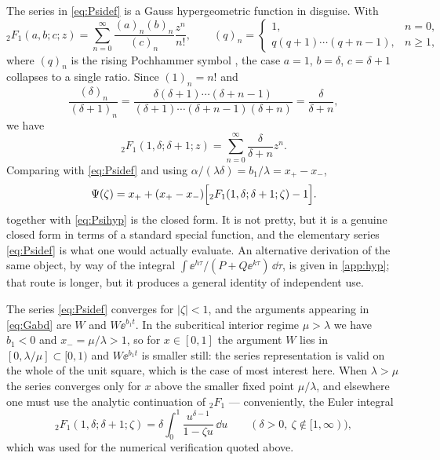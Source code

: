 The series in \cref{eq:Psidef} is a Gauss hypergeometric function in disguise. With
\begin{equation}
\label{eq:2F1def}
{}_2F_1(a,b;c;z) = \sum_{n=0}^{\infty}\frac{(a)_n(b)_n}{(c)_n}\frac{z^n}{n!},
\qquad
(q)_n = \begin{cases}1, & n=0,\\ q(q+1)\cdots(q+n-1), & n\ge1,\end{cases}
\end{equation}
where $(q)_n$ is the rising Pochhammer symbol \cite{Olver2010}, the case $a=1$,
$b=\delta$, $c=\delta+1$ collapses to a single ratio. Since $(1)_n = n!$ and
\begin{equation}
\label{eq:pochcancel}
\frac{(\delta)_n}{(\delta+1)_n}
= \frac{\delta(\delta+1)\cdots(\delta+n-1)}{(\delta+1)\cdots(\delta+n-1)(\delta+n)}
= \frac{\delta}{\delta+n},
\end{equation}
we have
\begin{equation}
\label{eq:2F1simple}
{}_2F_1(1,\delta;\delta+1;z) = \sum_{n=0}^{\infty}\frac{\delta}{\delta+n}z^n .
\end{equation}
Comparing with \cref{eq:Psidef} and using
$\alpha/(\lambda\delta) = b_1/\lambda = x_+-x_-$,
\begin{equation}
\label{eq:Psihyp}
\Psi(\zeta) = x_+ + (x_+-x_-)\Bigl[{}_2F_1(1,\delta;\delta+1;\zeta)-1\Bigr] .
\end{equation}
 together with \cref{eq:Psihyp} is the closed form. It is not pretty,
but it is a genuine closed form in terms of a standard special function, and the
elementary series \cref{eq:Psidef} is what one would actually evaluate. An
alternative derivation of the same object, by way of the integral
$\int\ee^{h\tau}/(P+Q\ee^{k\tau})\,\dd\tau$, is given in \cref{app:hyp}; that route
is longer, but it produces a general identity of independent use.

\begin{remark}
\label{rem:domain}
The series \cref{eq:Psidef} converges for $|\zeta|<1$, and the arguments appearing
in \cref{eq:Gabd} are $W$ and $W\ee^{b_1t}$. In the subcritical interior regime
$\mu>\lambda$ we have $b_1<0$ and $x_- = \mu/\lambda>1$, so for $x\in[0,1]$ the
argument $W$ lies in $[0,\lambda/\mu]\subset[0,1)$ and $W\ee^{b_1t}$ is smaller
still: the series representation is valid on the whole of the unit square, which is
the case of most interest here. When $\lambda>\mu$ the series converges only for
$x$ above the smaller fixed point $\mu/\lambda$, and elsewhere one must use the
analytic continuation of ${}_2F_1$ --- conveniently, the Euler integral
\begin{equation*}
{}_2F_1(1,\delta;\delta+1;\zeta) = \delta\int_0^1\frac{u^{\delta-1}}{1-\zeta u}\,\dd u
\qquad(\delta>0,\ \zeta\notin[1,\infty)),
\end{equation*}
which was used for the numerical verification quoted above.
\end{remark}

